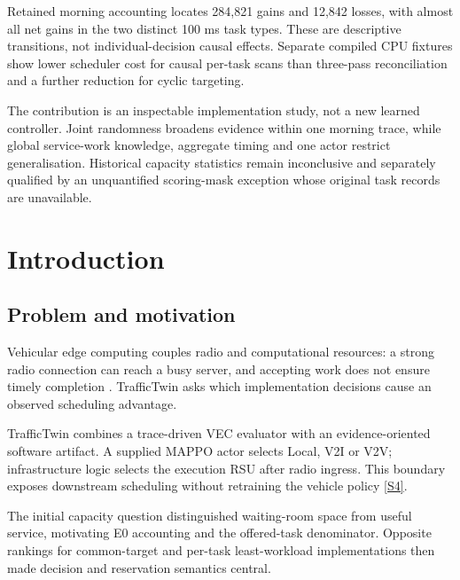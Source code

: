 \documentclass[11pt,a4paper]{article}
\begin{document}
Retained morning accounting locates 284,821 gains and 12,842 losses, with almost all net gains in the two distinct 100 ms task types. These are descriptive transitions, not individual-decision causal effects. Separate compiled CPU fixtures show lower scheduler cost for causal per-task scans than three-pass reconciliation and a further reduction for cyclic targeting.

The contribution is an inspectable implementation study, not a new learned controller. Joint randomness broadens evidence within one morning trace, while global service-work knowledge, aggregate timing and one actor restrict generalisation. Historical capacity statistics remain inconclusive and separately qualified by an unquantified scoring-mask exception whose original task records are unavailable.

\section{Introduction}\label{sec:1}

\subsection{Problem and motivation}\label{sec:1.1}

Vehicular edge computing couples radio and computational resources: a strong radio connection can reach a busy server, and accepting work does not ensure timely completion \cite{ref1}. TrafficTwin asks which implementation decisions cause an observed scheduling advantage.

TrafficTwin combines a trace-driven VEC evaluator with an evidence-oriented software artifact. A supplied MAPPO actor selects Local, V2I or V2V; infrastructure logic selects the execution RSU after radio ingress. This boundary exposes downstream scheduling without retraining the vehicle policy \hyperref[source-s4]{[S4]}.

The initial capacity question distinguished waiting-room space from useful service, motivating E0 accounting and the offered-task denominator. Opposite rankings for common-target and per-task least-workload implementations then made decision and reservation semantics central.
\end{document}
